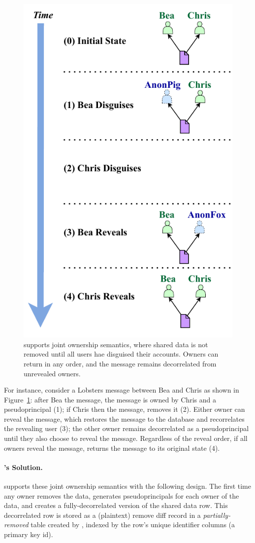 \begin{figure}
    \centering
    \includegraphics[width=.6\textwidth]{figs/shared_hl}
  \caption{\sys supports joint ownership semantics, where shared data is not
    removed until all users hae disguised their accounts. Owners can return in
    any order, and the message remains decorrelated from unrevealed owners.}
\label{f:shared:hl}
\end{figure}


%
For instance, consider a Lobsters message between Bea and Chris as shown in
Figure~\ref{f:shared:hl}: after Bea \xxs the message, the message is owned by
Chris and a pseudoprincipal (1); if Chris then \xxs the message, \sys removes it
(2).
%
Either owner can reveal the message, which restores the message to the database
and recorrelates the revealing user (3); the other owner remains decorrelated as a
pseudoprincipal until they also choose to reveal the message.
%
Regardless of the reveal order, if all owners reveal the message, \sys returns
the message to its original state (4).
%


%
\paragraph{\sys's Solution.}

\sys supports these joint ownership semantics with the following design.
%
The first time any owner removes the data, \sys generates pseudoprincipals for
each owner of the data, and creates a fully-decorrelated version of the shared data row. 
%
This decorrelated row is stored as a (plaintext) remove diff record in a
\emph{partially-removed} table created by \sys, indexed by the row's unique
identifier columns (\eg a primary key id).

